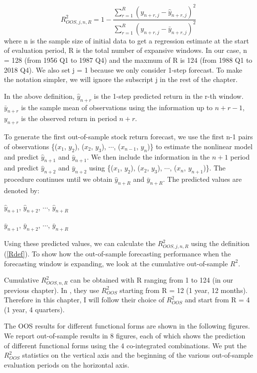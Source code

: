 \documentclass[a4paper,12pt,times,numbered,print,index]{report}
\numberwithin{equation}{section}
\begin{document}
	\begin{equation}
		R_{O O S, j, n, R}^{2}=1-\frac{\sum_{r=1}^{R}\left(y_{n+r, j}-\widehat{y}_{n+r, j}\right)^{2}}{\sum_{r=1}^{R}\left(y_{n+r, j}-\bar{y}_{n+r, j}\right)^{2}}
		\label{Rdef}
	\end{equation}
	where n is the sample size of initial data to get a regression estimate at the start of evaluation period, R is the total number of expansive windows. In our case, n = 128 (from 1956 Q1 to 1987 Q4) and the maxmum of R is 124 (from 1988 Q1 to 2018 Q4). We also set j = 1 because we only consider 1-step forecast. To make the notation simpler, we will ignore the subscript j in the rest of the chapter.  
	
	In the above definition, $\hat{y}_{n+r}$ is the 1-step predicted return in the r-th window. $\bar{y}_{n+r}$ is the sample mean of observations using the information up to $n+r-1$,  $y_{n+r}$ is the observed return in period $n+r$. 
	
	To generate the first out-of-sample stock return forecast, we use the first n-1 pairs of observations \{($x_1$, $y_2$), ($x_2$, $y_3$), $\cdots$, ($x_{n-1}$, $y_{n}$)\} to estimate the nonlinear model and predict $\hat{y}_{n+1}$ and $\bar{y}_{n+1}$. 
	We then include the information in the $n+1$ period and predict $\hat{y}_{n+2}$ and $\bar{y}_{n+2}$ using \{($x_1$, $y_2$), ($x_2$, $y_3$), $\cdots$, ($x_{n}$, $y_{n+1}$)\}. 
	The procedure continues until we obtain $\hat{y}_{n+R}$ and $\bar{y}_{n+R}$. The predicted values are denoted by:
	\begin{center}
		$\hat{y}_{n+1}$, $\hat{y}_{n+2}$, $\cdots$, $\hat{y}_{n+R}$
		
		$\bar{y}_{n+1}$, $\bar{y}_{n+2}$, $\cdots$, $\bar{y}_{n+R}$
	\end{center}
	
	Using these predicted values, we can calculate the $R_{O O S, j, n, R}^{2}$ using the definition (\ref{Rdef}). To show how the out-of-sample forecasting performance when the forecasting window is expanding, we look at the cumulative out-of-sample $R^2$.
	
	Cumulative $R_{O O S, n, R}^{2}$ can be obtained with R ranging from 1 to 124 (in our previous chapter). In \cite{cheng2019nonparametric}, they use $R^2_{OOS}$ starting from R = 12 (1 year, 12 months). Therefore in this chapter, I will follow their choice of $R^2_{OOS}$ and start from R = 4 (1 year, 4 quarters). 
	
	The OOS results for different functional forms are shown in the following figures. We report out-of-sample results in
	8 figures, each of which shows the prediction of different functional forms using the 4 co-integrated combinations. We put the $R^2_{OOS}$ statistics on the vertical axis and the beginning of the various out-of-sample evaluation periods on the horizontal axis. 
	
\end{document}
